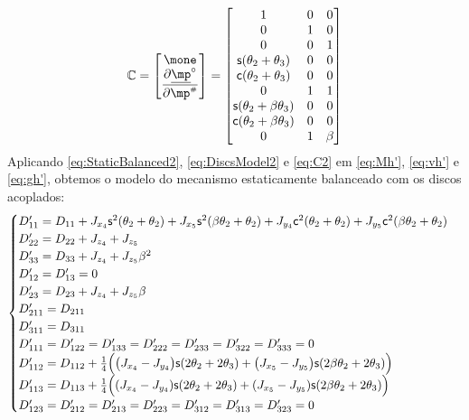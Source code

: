 \documentclass[a4paper,11pt,brazil,fleqn]{article}
\begin{document}
\begin{equation}\label{eq:C2}
\mC =
\begin{bmatrix}
\mone \\
\displaystyle\frac{\partial \underline{\mp}^\circ}{\partial \mp\ssh}
\end{bmatrix}  =
\begin{bmatrix}
1 & 0 & 0 \\
0 & 1 & 0 \\
0 & 0 & 1 \\
\ssin(\theta_2+\theta_3) & 0 & 0 \\
\ccos(\theta_2+\theta_3) & 0 & 0 \\
0 & 1 & 1 \\
\ssin(\theta_2+\beta\theta_3) & 0 & 0 \\
\ccos(\theta_2+\beta\theta_3) & 0 & 0 \\
0 & 1 & \beta \\
\end{bmatrix} 
\end{equation}
Aplicando \eqref{eq:StaticBalanced2}, \eqref{eq:DiscsModel2} e \eqref{eq:C2} em \eqref{eq:Mh'}, \eqref{eq:vh'} e \eqref{eq:gh'}, obtemos o modelo do mecanismo estaticamente balanceado com os discos acoplados:
\begin{equation}\label{eq:CoupledDynamics2}
\begin{cases}
D'_{11} = D_{11} + J_{x_4}\mathsf{s}^2(\theta_2+\theta_2) + J_{x_5}\mathsf{s}^2(\beta\theta_2+\theta_2) + J_{y_4}\mathsf{c}^2(\theta_2+\theta_2) + J_{y_5}\mathsf{c}^2(\beta\theta_2+\theta_2) \\
D'_{22} = D_{22} + J_{z_4} + J_{z_5} \\
D'_{33} = D_{33} + J_{z_4} + J_{z_5} \beta^2\\
D'_{12} = D'_{13} = 0\\
D'_{23} = D_{23} + J_{z_4} + J_{z_5} \beta \\
D'_{211} = D_{211} \\
D'_{311} = D_{311} \\
D'_{111} = D'_{122} = D'_{133} = D'_{222} = D'_{233} = D'_{322} = D'_{333} = 0 \\
D'_{112} = D_{112} +  \frac{1}{4} \Big( \big(J_{x_4} - J_{y_4}\big)\mathsf{s}(2\theta_2+2\theta_3) + \big(J_{x_5} - J_{y_5}\big)\mathsf{s}(2\beta\theta_2+2\theta_3) \Big) \\
D'_{113} =  D_{113} + \frac{1}{4} \Big( (J_{x_4} - J_{y_4})\mathsf{s}(2\theta_2+2\theta_3) + (J_{x_5} - J_{y_5})\mathsf{s}(2\beta\theta_2+2\theta_3) \Big) \\
D'_{123} = D'_{212} = D'_{213} = D'_{223} = D'_{312} = D'_{313} = D'_{323} = 0 \\
\end{cases}
\end{equation}
\end{document}
